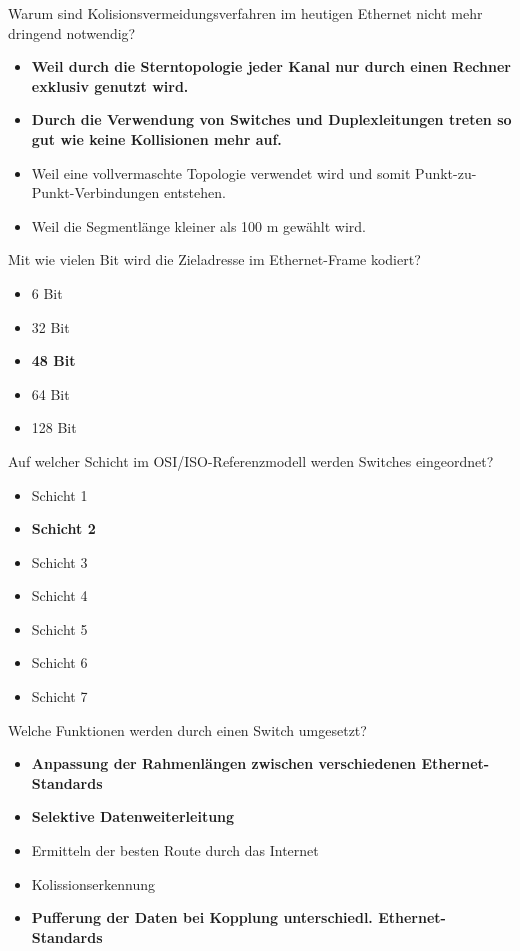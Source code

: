 \documentclass{article}
\begin{document}
	Warum sind Kolisionsvermeidungsverfahren im heutigen Ethernet nicht mehr dringend notwendig?
	\begin{itemize}
		\item \textbf{Weil durch die Sterntopologie jeder Kanal nur durch einen Rechner exklusiv genutzt wird.}
		\item \textbf{Durch die Verwendung von Switches und Duplexleitungen treten so gut wie keine Kollisionen mehr auf.}
		\item Weil eine vollvermaschte Topologie verwendet wird und somit Punkt-zu-Punkt-Verbindungen entstehen.
		\item Weil die Segmentlänge kleiner als 100 m gewählt wird.
	\end{itemize}

	Mit wie vielen Bit wird die Zieladresse im Ethernet-Frame kodiert? 
	\begin{itemize}
		\item 6 Bit
		\item 32 Bit
		\item \textbf{48 Bit}
		\item 64 Bit
		\item 128 Bit
	\end{itemize}

	Auf welcher Schicht im OSI/ISO-Referenzmodell werden Switches eingeordnet?
	\begin{itemize}
		\item Schicht 1
		\item \textbf{Schicht 2}
		\item Schicht 3
		\item Schicht 4
		\item Schicht 5
		\item Schicht 6
		\item Schicht 7
	\end{itemize}

	Welche Funktionen werden durch einen Switch umgesetzt?
	\begin{itemize}
		\item \textbf{Anpassung der Rahmenlängen zwischen verschiedenen Ethernet-Standards}
		\item \textbf{Selektive Datenweiterleitung}
		\item Ermitteln der besten Route durch das Internet
		\item Kolissionserkennung
		\item \textbf{Pufferung der Daten bei Kopplung unterschiedl. Ethernet-Standards}
	\end{itemize}
\end{document}
